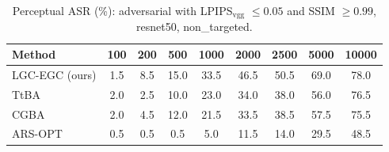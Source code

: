 \begin{table}[t]
\centering\footnotesize
\caption{Perceptual ASR (\%): adversarial with LPIPS$_{\mathrm{vgg}}$ $\le 0.05$ and SSIM $\ge 0.99$, resnet50, non\_targeted.}
\begin{tabular}{lcccccccc}
\toprule
Method & 100 & 200 & 500 & 1000 & 2000 & 2500 & 5000 & 10000 \\
\midrule
LGC-EGC (ours) & 1.5 & 8.5 & 15.0 & 33.5 & 46.5 & 50.5 & 69.0 & 78.0 \\
TtBA & 2.0 & 2.5 & 10.0 & 23.0 & 34.0 & 38.0 & 56.0 & 76.5 \\
CGBA & 2.0 & 4.5 & 12.0 & 21.5 & 33.5 & 38.5 & 57.5 & 75.5 \\
ARS-OPT & 0.5 & 0.5 & 0.5 & 5.0 & 11.5 & 14.0 & 29.5 & 48.5 \\
\bottomrule
\end{tabular}
\end{table}

